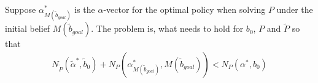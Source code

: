 \documentclass{article}
\newcommand{\td}[1]{\tilde{#1}}
\begin{document}
\begin{definition}
Suppose $\alpha^{*}_{M(\td{b}_{goal})}$ is the $\alpha$-vector for the optimal policy when solving $P$ under the initial belief $M(\td{b}_{goal})$. The problem is, what needs to hold for $b_0$, $P$ and $\td{P}$ so that %
\begin{align}
N_{\td{P}}(\td{\alpha}^*, \td{b}_0) + N_{P}(\alpha^{*}_{M(\td{b}_{goal})}, M(\td{b}_{goal})) < N_P(\alpha^*, b_0)
\end{align}





\end{definition}



\end{document}
